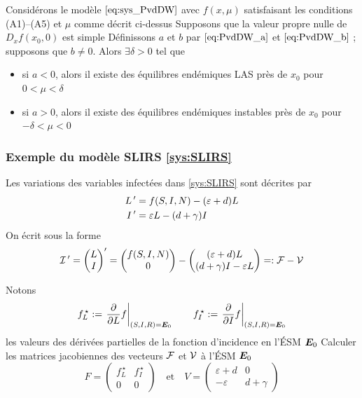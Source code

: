 \documentclass[aspectratio=169]{beamer}\usepackage[]{graphicx}\usepackage[]{xcolor}
\begin{document}
\begin{frame}
\begin{theorem}
Considérons le modèle $\eqref{eq:sys_PvdDW}$ avec $f(x,\mu)$ satisfaisant les conditions (A1)–(A5) et $\mu$ comme décrit ci-dessus
\vskip1cm
Supposons que la valeur propre nulle de $D_xf(x_0,0)$ est simple
\vskip1cm
Définissons $a$ et $b$ par $\eqref{eq:PvdDW_a}$ et $\eqref{eq:PvdDW_b}$ ; supposons que $b\neq 0$. Alors $\exists\delta > 0$ tel que
\begin{itemize}
\item si $a < 0$, alors il existe des équilibres endémiques LAS près de $x_0$ pour $0 < \mu < \delta$
\item si $a > 0$, alors il existe des équilibres endémiques instables près de $x_0$ pour $-\delta < \mu < 0$
\end{itemize}
\end{theorem}
\end{frame}


\begin{frame}
\frametitle{Exemple du modèle SLIRS \eqref{sys:SLIRS}}
Les variations des variables infectées dans \eqref{sys:SLIRS} sont décrites par
\begin{align*}
L\,' &= f(S,I,N)-(\varepsilon+d) L \\
I\,' &= \varepsilon L -(d+\gamma) I
\end{align*}
On écrit sous la forme
\begin{equation}
\mathcal{I}\,' = 
\left(
\begin{matrix}
L \\
I
\end{matrix}
\right)'
=\left(
\begin{matrix}
f(S,I,N) \\
0
\end{matrix}
\right)
-
\left(
\begin{matrix}
(\varepsilon+d) L \\
(d+\gamma) I-\varepsilon L
\end{matrix}
\right)=:\mathcal{F}-\mathcal{V}
\end{equation}
\end{frame}


\begin{frame}
Notons
\[
f_L^{\,\star}:=
\left.\frac{\partial}{\partial L}f
\right|_{(S,I,R)=\bm{E}_0}
\quad\quad 
f_I^{\,\star}:=
\left.\frac{\partial}{\partial I}f
\right|_{(S,I,R)=\bm{E}_0}
\]
les valeurs des dérivées partielles de la fonction d'incidence en l'ÉSM $\bm{E}_0$
\vfill
Calculer les matrices jacobiennes des vecteurs $\mathcal{F}$ et $\mathcal{V}$ à l'ÉSM $\bm{E}_0$
\begin{equation}
F=\left(
\begin{matrix}
f_L^{\,\star} & f_I^{\,\star} \\
0 & 0
\end{matrix}
\right)
\quad\text{et}\quad
V=\left(
\begin{matrix}
\varepsilon+d & 0 \\
-\varepsilon & d+\gamma
\end{matrix}
\right)
\end{equation}
\end{frame}
\end{document}
